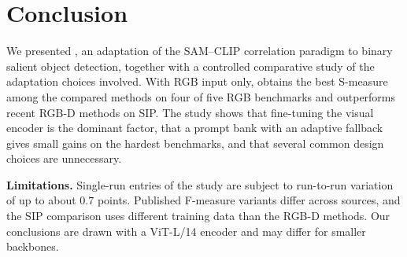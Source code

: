 \section{Conclusion}
\label{sec:conclusion}

\begin{revpar}
We presented \methodname{}, an adaptation of the SAM--CLIP correlation paradigm to
binary salient object detection, together with a controlled comparative study of
the adaptation choices involved. With RGB input only, \methodname{} obtains the
best S-measure among the compared methods on four of five RGB benchmarks and
outperforms recent RGB-D methods on SIP. The study shows that fine-tuning the
visual encoder is the dominant factor, that a prompt bank with an adaptive fallback
gives small gains on the hardest benchmarks, and that several common design
choices are unnecessary.

\noindent\textbf{Limitations.} Single-run entries of the study are subject to
run-to-run variation of up to about $0.7$ points. Published F-measure variants
differ across sources, and the SIP comparison uses different training data than
the RGB-D methods. Our conclusions are drawn with a ViT-L/14 encoder and may differ
for smaller backbones.
\end{revpar}
